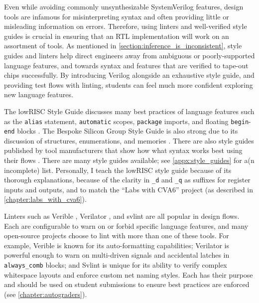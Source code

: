 Even while avoiding commonly unsynthesizable SystemVerilog features, design tools are infamous for misinterpreting syntax and often providing little or misleading information on errors.
Therefore, using linters and well-verified style guides is crucial in ensuring that an RTL implementation will work on an assortment of tools.
As mentioned in \autoref{section:inference_is_inconsistent}, style guides and linters help direct engineers away from ambiguous or poorly-supported language features, and towards syntax and features that are verified to tape-out chips successfully.
By introducing Verilog alongside an exhaustive style guide, and providing test flows with linting, students can feel much more confident exploring new language features.

The lowRISC Style Guide discusses many best practices of language features such as the \texttt{alias} statement, \texttt{automatic} scopes, \texttt{package} imports, and floating \texttt{begin}-\texttt{end} blocks \cite{lowRISCstyleguides}.
The Bespoke Silicon Group Style Guide is also strong due to its discussion of structures, enumerations, and memories \cite{BSGstyleguide}.
There are also style guides published by tool manufacturers that show how what syntax works best using their flows \cite{Xilinxstyleguide, Intelstyleguide, Latticestyleguide}.
There are many style guides available; see \autoref{appx:style_guides} for a(n incomplete) list.
Personally, I teach the lowRISC style guide because of its thorough explanations, because of the clarity in \texttt{_d} and \texttt{_q} as suffixes for register inputs and outputs, and to match the \enquote{Labs with CVA6} project (as described in \autoref{chapter:labs_with_cva6}).

Linters such as Verible \cite{veribleGitHub}, Verilator \cite{verilatorGitHub}, and svlint \cite{svlintGitHub} are all popular in design flows.
Each are configurable to warn on or forbid specific language features, and many open-source projects choose to lint with more than one of these tools.
For example, Verible is known for its auto-formatting capabilities; Verilator is powerful enough to warn on multi-driven signals and accidental latches in \texttt{always_comb} blocks; and Svlint is unique for its ability to verify complex whitespace layouts and enforce custom net naming styles.
Each has their purpose and should be used on student submissions to ensure best practices are enforced (see \autoref{chapter:autograders}).

